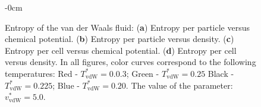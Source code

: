 \documentclass[entropy,article,submit,pdftex,moreauthors]{Definitions/mdpi}
\begin{document}
\begin{figure}[H]
\begin{adjustwidth}{-\extralength}{0cm}
		\end{adjustwidth}
	\caption{Entropy of the van der Waals fluid: (\textbf{a}) Entropy per particle versus chemical potential. (\textbf{b}) Entropy per particle versus density. (\textbf{c}) Entropy per cell versus chemical potential. (\textbf{d}) Entropy per cell versus density. In all figures, color curves correspond to the following temperatures: Red - $T^*_{\mathrm{vdW}}=0.0.3$; Green - $T^*_{\mathrm{vdW}}=0.25$ Black - $T^*_{\mathrm{vdW}}=0.225$; Blue - $T^*_{\mathrm{vdW}} = 0.20$. The value of the parameter: $v^*_{\mathrm{vdW}}=5.0$.\label{fig:entropy_vdW}}
\end{figure} 
\end{document}
